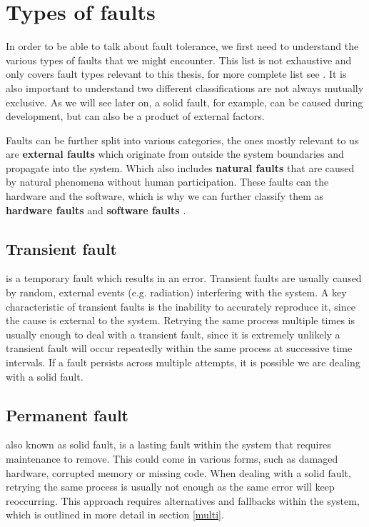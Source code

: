 \section{Types of faults}

In order to be able to talk about fault tolerance, we first need to understand the various types of faults that we might encounter. This list is not exhaustive and only covers fault types relevant to this thesis, for more complete list see \cite{1335465}. It is also important to understand two different classifications are not always mutually exclusive. As we will see later on, a solid fault, for example, can be caused during development, but can also be a product of external factors.

Faults can be further split into various categories, the ones mostly relevant to us are \textbf{external faults} which originate from outside the system boundaries and propagate into the system. Which also includes \textbf{natural faults} that are caused by natural phenomena without human participation. These faults can the hardware and the software, which is why we can further classify them as \textbf{hardware faults} and \textbf{software faults} \cite{1335465}. \\

\subsection{Transient fault} is a temporary fault which results in an error. Transient faults are usually caused by random, external events (e.g. radiation) interfering with the system. A key characteristic of transient faults is the inability to accurately reproduce it, since the cause is external to the system. Retrying the same process multiple times is usually enough to deal with a transient fault, since it is extremely unlikely a transient fault will occur repeatedly within the same process at successive time intervals. If a fault persists across multiple attempts, it is possible we are dealing with a solid fault. \\

\subsection{Permanent fault} also known as solid fault, is a lasting fault within the system that requires maintenance to remove. This could come in various forms, such as damaged hardware, corrupted memory or missing code. When dealing with a solid fault, retrying the same process is usually not enough as the same error will keep reoccurring. This approach requires alternatives and fallbacks within the system, which is outlined in more detail in section \ref{multi}. \\

